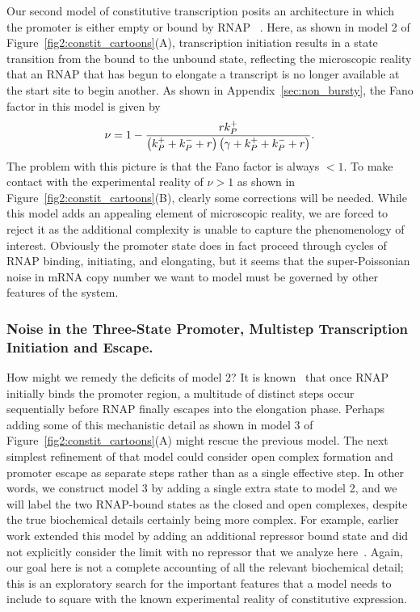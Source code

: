 Our second model of constitutive transcription posits an architecture in which
the promoter is either empty or bound by RNAP ~\cite{Phillips2015a,
Phillips2019}. Here,  as shown in model 2 of Figure~\ref{fig2:constit_cartoons}(A),
transcription initiation results in a state transition from the bound to the
unbound state, reflecting the microscopic reality that an RNAP that has begun to
elongate a transcript is no longer available at the start site to begin another.
As shown in Appendix~\ref{sec:non_bursty}, the Fano factor in this model is
given by
\begin{align}
    \nu = 1 -
        \frac{r{k}_{P}^{+}}
            {\left({k}_{P}^{+} + {k}_{P}^{-} + r\right)
             \left(\gamma + {k}_{P}^{+} + {k}_{P}^{-} + r\right)}.
\label{eq:model2_fano}
\end{align}
The problem with this picture is that the Fano factor is always $<1$. To make
 contact with the experimental reality of $\nu>1$ as shown in
 Figure~\ref{fig2:constit_cartoons}(B), clearly some corrections will be needed.
 While this model adds an appealing element of microscopic reality, we are
 forced to reject it as the additional complexity is unable to capture the
 phenomenology of interest. Obviously the promoter state does in fact proceed
 through cycles of RNAP binding, initiating, and elongating, but it seems that
 the super-Poissonian noise in mRNA copy number we want to model must be
 governed by other features of the system.

\subsubsection{Noise in the Three-State Promoter, Multistep Transcription
Initiation and Escape.} 

How might we remedy the deficits of model 2? It is known~\cite{DeHaseth1998}
that once RNAP initially binds the promoter region, a multitude of distinct
steps occur sequentially before RNAP finally escapes into the elongation phase.
Perhaps adding some of this mechanistic detail as shown in model 3 of
Figure~\ref{fig2:constit_cartoons}(A) might rescue the previous model. The next
simplest refinement of that model could consider open complex formation and
promoter escape as separate steps rather than as a single effective step. In
other words, we construct model 3 by adding a single extra state to model 2, and
we will label the two RNAP-bound states as the closed and open complexes,
despite the true biochemical details certainly being more complex. For example,
earlier work extended this model by adding an additional repressor bound state
and did not explicitly consider the limit with no repressor that we analyze
here~\cite{Mitarai2015}. Again, our goal here is not a complete accounting of
all the relevant biochemical detail; this is an exploratory search for the
important features that a model needs to include to square with the known
experimental reality of constitutive expression.

